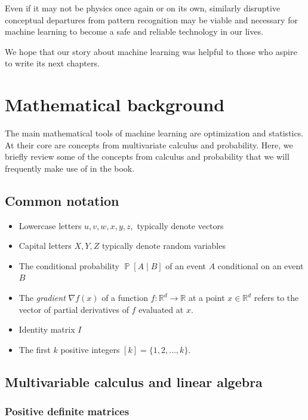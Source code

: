\documentclass{tufte-book}
\begin{document}
Even if it may not be physics once again or on its own, similarly
disruptive conceptual departures from pattern recognition may be viable
and necessary for machine learning to become a safe and reliable
technology in our lives.

We hope that our story about machine learning was helpful to those who
aspire to write its next chapters.

\chapter{Mathematical background}

The main mathematical tools of machine learning are optimization and
statistics. At their core are concepts from multivariate calculus and
probability. Here, we briefly review some of the concepts from calculus
and probability that we will frequently make use of in the book.

\hypertarget{common-notation}{%
\section{Common notation}\label{common-notation}}

\begin{itemize}
\tightlist
\item
  Lowercase letters \(u, v, w, x, y, z,\) typically denote vectors
\item
  Capital letters \(X, Y, Z\) typically denote random variables
\item
  The conditional probability \(\mathop\mathbb{P}[A \mid B]\) of an
  event \(A\) conditional on an event \(B\)
\item
  The \emph{gradient} \(\nabla f(x)\) of a function
  \(f\colon \mathbb{R}^d\to\mathbb{R}\) at a point \(x\in\mathbb{R}^d\)
  refers to the vector of partial derivatives of \(f\) evaluated at
  \(x\).
\item
  Identity matrix \(I\)
\item
  The first \(k\) positive integers \([k]=\{1, 2, \dots, k\}.\)
\end{itemize}

\hypertarget{multivariable-calculus-and-linear-algebra}{%
\section{Multivariable calculus and linear
algebra}\label{multivariable-calculus-and-linear-algebra}}

\hypertarget{positive-definite-matrices}{%
\subsection{Positive definite
matrices}\label{positive-definite-matrices}}
\end{document}

